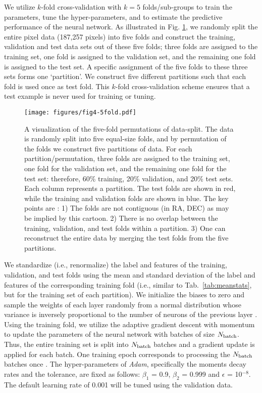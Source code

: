 We utilize  $k$-fold cross-validation with $k=5$ folds/sub-groups to train the parameters, tune the hyper-parameters, and to estimate the predictive performance of the neural network. As illustrated in Fig. \ref{fig:5fold}, we randomly split the entire pixel data (187,257 pixels) into five folds and construct the training, validation and test data sets out of these five folds; three folds are assigned to the training set, one fold is assigned to the validation set, and the remaining one fold is assigned to the test set. A specific assignment of the five folds to these three sets forms one `partition'. We construct five different partitions such that each fold is used once as test fold. This $k$-fold cross-validation scheme ensures that a test example is never used for training or tuning.\\

\begin{figure}
\centering
 \texttt{[image: figures/fig4-5fold.pdf]}
 \caption{A visualization of the five-fold permutations of data-split. The data is randomly split into five equal-size folds, and by permutation of the folds we construct five partitions of data. For each partition/permutation, three folds are assigned to the training set, one fold for the validation set, and the remaining one fold for the test set: therefore, 60\% training, 20\% validation, and 20\% test sets. Each column represents a partition. The test folds are shown in red, while the training and validation folds are shown in blue. The key points are : 1) The folds are not contiguous (in RA, DEC) as may be implied by this cartoon. 2) There is no overlap between the training, validation, and test folds within a partition. 3) One can reconstruct the entire data by merging the test folds from the five partitions.}
\label{fig:5fold}
\end{figure}
     
     
We standardize (i.e., renormalize) the label and features of the training, validation, and test folds using the mean and standard deviation of the label and features of the corresponding training fold (i.e., similar to Tab.~\ref{tab:meanstats}, but for the training set of each partition). We initialize the biases to zero and sample the weights of each layer randomly from a normal distribution whose variance is inversely proportional to the number of neurons of the previous layer \citep[see e.g.,][]{he2015delving}. Using the training fold, we utilize the adaptive gradient descent with momentum \citep[\textit{Adam},][]{kingma2014adam} to update the parameters of the neural network with batches of size $N_{{\rm batch}}$. Thus, the entire training set is split into $N_{{\rm batch}}$ batches and a gradient update is applied for each batch. One training epoch corresponds to processing the $N_{{\rm batch}}$ batches once \citep[for more details on the training procedure, we refer the reader to see e.g.,][]{ruder2016overview}. The hyper-parameters of \textit{Adam}, specifically the moments decay rates and the tolerance, are fixed as follows: $\beta_{1}$ = 0.9, $\beta_{2}$ = 0.999 and $\epsilon$ = 10$^{-8}$. The default learning rate of 0.001 will be tuned using the validation data.\\ 

